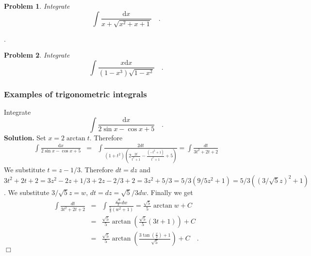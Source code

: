 \documentclass[12pt]{book}
\newcommand{\diff}{\text{d}}
\newenvironment{solution}{\textbf{Solution.} }{$\Box$}
\newtheorem{problem}{Problem}[section]
\begin{document}
\begin{problem}
Integrate 
\[
\int \frac{\diff x}{x+\sqrt{x^2+x+1}}\quad .
\]
\end{problem}
\quad .
\begin{problem}
Integrate 
\[
\int \frac{x\diff x}{(1-x^3)\sqrt{1-x^2}}\quad .
\]
\end{problem}
\subsubsection{Examples of trigonometric integrals}
Integrate 
\[
\int \frac{\diff x}{2\sin x-\cos x +5}\quad .
\]
\begin{solution}
Set $x=2\arctan t$. Therefore 
\[
\begin{array}{rcl}
\displaystyle \int \frac{\diff x}{2\sin x-\cos x +5}&=&\displaystyle \int \frac{2dt}{(1+t^2)\left(2\frac{2t}{t^2+1}- \frac{(-t^2+1) }{t^2+1}+5\right)}= \int \frac{dt}{3t^2+2t+2}
\end{array}
\]
We substitute $t=z-1/3$. Therefore $dt=dz$ and $3t^2+2t+2=3z^2-2z+1/3+2z-2/3+2=3z^2+5/3= 5/3(9/5z^2+1)= 5/3((3/\sqrt{5}z)^2+1)$. We substitute $3/\sqrt{5}z=w$, $dt=dz=\sqrt{5}/3dw$. Finally we get 
\[
\begin{array}{rcl}
\displaystyle \int \frac{dt}{3t^2+2t+2}&=& \displaystyle \int \frac{\frac{\sqrt{5}}{3}dw}{\frac{5}{3}(w^2+1)}= \frac{\sqrt{5}}{5}\arctan w+C\\
&=&\displaystyle \frac{\sqrt{5}}{5}\arctan\left( \frac{\sqrt{5}}{5}(3t+1) \right)+C\\
&=&\displaystyle \frac{\sqrt{5}}{5}\arctan \left(\frac{3\tan \left(\frac{x}{2}\right)+1}{\sqrt{5}}\right)+C\quad .
\end{array}
\]
\end{solution}
\end{document}
